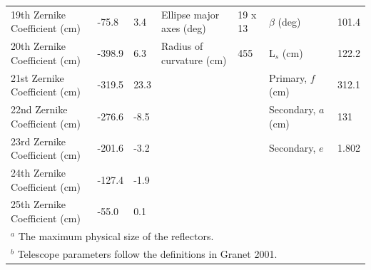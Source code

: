 \documentclass[]{spie}  %
\begin{document}
\begin{table}[ht]
\begin{adjustbox}{width=1.05\textwidth}
\begin{tabular}{|l|llll||ll|}
19th Zernike Coefficient (cm) & -75.8             & 3.4               & Ellipse major axes (deg)  & 19 x 13  & $\beta$  (deg)                 & 101.4 \\   
20th Zernike Coefficient (cm) & -398.9            & 6.3               & Radius of curvature (cm)  & 455      & L$_s$ (cm)                     & 122.2 \\   
21st Zernike Coefficient (cm) & -319.5            & 23.3              &                           &          & Primary, $f$ (cm)              & 312.1 \\   
22nd Zernike Coefficient (cm) & -276.6            & -8.5              &                           &          & Secondary, $a$ (cm)            & 131   \\   
23rd Zernike Coefficient (cm) & -201.6            & -3.2              &                           &          & Secondary, $e$                 &  1.802  \\
24th Zernike Coefficient (cm) & -127.4            & -1.9              &                           &          &                                &       \\
25th Zernike Coefficient (cm) & -55.0             & 0.1               &                           &          &                                &       \\\hline
\multicolumn{7}{l}{\footnotesize  $^a$ The maximum physical size of the reflectors.}\\
\multicolumn{7}{l}{\footnotesize  $^b$ Telescope parameters follow the definitions in Granet 2001.\cite{granet2001}} \\
\end{tabular}
\end{adjustbox}
\end{table}
\end{document}
